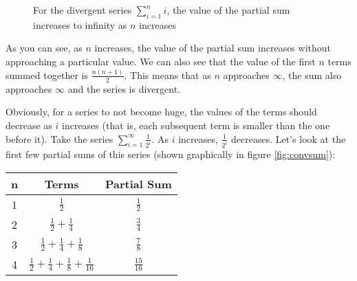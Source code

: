\begin{figure}[htbp]
\centering
    \caption{For the divergent series $\sum_{i=1}^n i$, the value of the 
    partial sum increases to infinity as $n$ increases}
    \label{fig:divsum}
\end{figure}

As you can see, as $n$ increases, the value of the partial sum 
increases without approaching a particular value. We can also see 
that the value of the first $n$ terms summed together is 
$\frac{n(n+1)}{2}$. This means that as $n$ approaches $\infty$, the 
sum also approaches $\infty$ and the series is divergent. 

Obviously, for a series to not become huge, the values of the terms 
should decrease as $i$ increases (that is, each subsequent term is 
smaller than the one before it). Take the series $\sum_{i=1}^\infty 
\frac{1}{2^i}$. As $i$ increases, $\frac{1}{2^i}$ decreases. Let's 
look at the first few partial sums of this series (shown graphically 
in figure \ref{fig:convsum}):
\begin{center}
\begin{tabular}{|c|c|c|}\hline
n & Terms & Partial Sum\\
\hline
1 & $\frac{1}{2}$ & $\frac{1}{2}$\\
\hline
2 & $\frac{1}{2} + \frac{1}{4}$ & $\frac{3}{4}$\\
\hline
3 & $\frac{1}{2} + \frac{1}{4} + \frac{1}{8}$ & $\frac{7}{8}$\\
\hline
4 & $\frac{1}{2} + \frac{1}{4} + \frac{1}{8} + \frac{1}{16}$ & 
$\frac{15}{16}$\\
\hline
\end{tabular}
\end{center}

